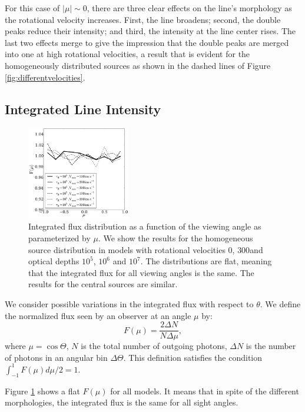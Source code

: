 \documentclass{emulateapj}
\newcommand{\kms}{{\ifmmode{{\mathrm{\,km\ s}^{-1}}}\else{\,km~s$^{-1}$}\fi}}
\begin{document}
For this case of $|\mu|\sim 0$, there are three clear effects on the
line's morphology as the rotational velocity increases. First, the
line broadens; second, the double peaks reduce their intensity; and
third, the intensity at the line center rises. The last two effects
merge to give the impression that the double peaks are merged into one
at high rotational velocities, a result that is evident for the
homogeneously distributed sources as shown in the dashed lines of
Figure \ref{fig:differentvelocities}. 


\subsection{Integrated Line Intensity}

\begin{figure}
\begin{center}
  \includegraphics[width=0.4\textwidth]{f5.pdf}
\end{center}
\caption{Integrated flux distribution as a function of the
  viewing angle as parameterized by $\mu$. We show the results for the
  homogeneous source distribution in models with rotational velocities
  $0$\kms, $300$\kms and  optical depths $10^5$, $10^6$ and $10^7$.
  The distributions are flat, meaning that the integrated flux for all
  viewing angles is the same. The results for the central sources are
  similar. 
\label{fig:muhisto}}
\end{figure}

We consider possible variations in the integrated flux with respect to
$\theta$. We define the normalized flux seen by an observer at an
angle $\mu$ by: \begin{equation}
F(\mu) = \frac{2\Delta N}{N\Delta \mu}, 
\end{equation} 
%
where $\mu=\cos\Theta$, $N$ is the total number of outgoing photons,
$\Delta N$ is the number of photons in an angular bin $\Delta
\Theta$. This definition satisfies the condition
$\int_{-1}^{1}F(\mu)d\mu/2=1$. 

Figure \ref{fig:muhisto} shows a flat $F(\mu)$ for all models. It
means that in spite of the different morphologies, the integrated flux
is the same for all sight angles.  
	
\end{document}

